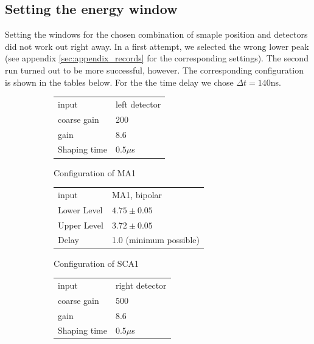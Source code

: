 \subsection{Setting the energy window}
\label{ssub:Setting the energy window}
Setting the windows for the chosen combination of smaple position and detectors did 
not work out right away. In a first attempt, we selected the wrong lower peak (see appendix 
    \ref{sec:appendix_records} for the corresponding settings). 
The second run turned out to be more successful, however. The corresponding configuration is 
shown in the tables below. For the the time delay we chose
$\Delta t = 140$ns.
\begin{figure}[h]
    \centering
    \begin{subfigure}[b]{0.4\linewidth}
        \begin{tabular}{|l|l|}
            \hline
            input           & left detector \\ 
            coarse gain     & 200 \\
            gain            & 8.6 \\
            Shaping time    & $0.5\mu$s \\
            \hline
        \end{tabular}
        \caption{Configuration of MA1}
    \end{subfigure}\qquad
    \begin{subfigure}[b]{0.4\linewidth}
        \begin{tabular}{|l|l|}
            \hline
            input           & MA1, bipolar \\ 
            Lower Level     & $4.75\pm0.05$ \\
            Upper Level     & $3.72\pm0.05$ \\
            Delay           & 1.0 (minimum possible) \\
            \hline
        \end{tabular}
        \caption{Configuration of SCA1}
    \end{subfigure}
    \begin{subfigure}[b]{0.4\linewidth}
        \begin{tabular}{|l|l|}
            \hline
            input           & right detector \\ 
            coarse gain     & 500 \\
            gain            & 8.6 \\
            Shaping time    & $0.5\mu$s \\

\end{tabular}
\end{subfigure}
\end{figure}
